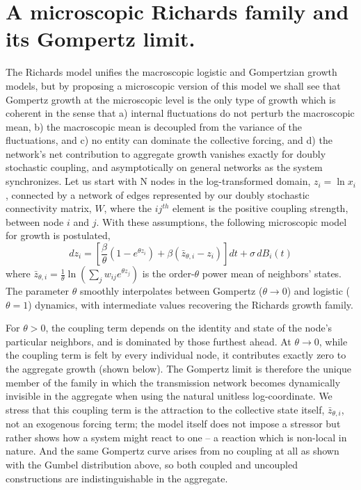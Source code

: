 \documentclass{article}
\begin{document}
\section{A microscopic Richards family and its Gompertz limit.}

The Richards model unifies the macroscopic logistic and Gompertzian growth models, but by proposing a microscopic version of this model we shall see that Gompertz growth at the microscopic level is the only type of growth which is coherent in the sense that a) internal fluctuations do not perturb the macroscopic mean, b) the macroscopic mean is decoupled from the variance of the fluctuations, and c) no entity can dominate the collective forcing, and d) the network's net contribution to aggregate growth vanishes exactly for doubly stochastic coupling, and asymptotically on general networks as the system synchronizes. Let us start with N nodes in the log-transformed domain, $z_i = \ln x_i$, connected by a network of edges represented by our doubly stochastic connectivity matrix, $W$, where the $ij^{th}$ element is the positive coupling strength, between node $i$ and $j$. With these assumptions, the following microscopic model for growth is postulated,
\begin{equation}
  \label{eq:newMicro}
  dz_i = \left[\frac{\beta}{\theta}(1 - e^{\theta z_i}) + \beta(\bar{z}_{\theta,i} - z_i)\right]dt + \sigma\,dB_i(t)
\end{equation}
where $\bar{z}_{\theta,i} = \frac{1}{\theta}\ln(\sum_j w_{ij} e^{\theta z_j})$ is the order-$\theta$ power mean of neighbors' states. The parameter $\theta$ smoothly interpolates between Gompertz ($\theta \to 0$) and logistic ($\theta = 1$) dynamics, with intermediate values recovering the Richards growth family. 

For $\theta > 0$, the coupling term depends on the identity and state of the node's particular neighbors, and is dominated by those furthest ahead. At $\theta\rightarrow0$, while the coupling term is felt by every individual node, it contributes exactly zero to the aggregate growth (shown below). The Gompertz limit is therefore the unique member of the family in which the transmission network becomes dynamically invisible in the aggregate when using the natural unitless log-coordinate. We stress that this coupling term is the attraction to the collective state itself, $\bar{z}_{\theta,i}$, not an exogenous forcing term; the model itself does not impose a stressor but rather shows how a system might react to one -- a reaction which is non-local in nature. And the same Gompertz curve arises from no coupling at all as shown with the Gumbel distribution above, so both coupled and uncoupled constructions are indistinguishable in the aggregate.
\end{document}
